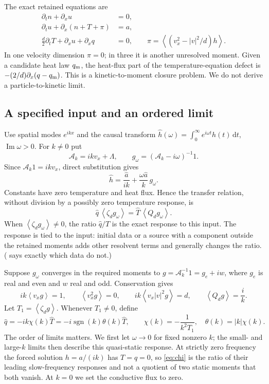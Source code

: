 \documentclass[11pt]{article}
\newcommand{\dd}{\,\mathrm d}
\newcommand{\av}[1]{\left\langle #1\right\rangle}
\newcommand{\A}{\mathcal A}
\newcommand{\sgn}{\operatorname{sgn}}
\newcommand{\Imag}{\operatorname{Im}}
\theoremstyle{definition}
\theoremstyle{remark}
\numberwithin{equation}{section}
\begin{document}
The exact retained equations are
\begin{align}
 \partial_tn+\partial_xu&=0,\nonumber\\
 \partial_tu+\partial_x(n+T+\pi)&=a,\nonumber\\
 \frac d2\partial_tT+\partial_xu+\partial_xq&=0,
 \qquad
 \pi=\av{(v_x^2-|v|^2/d)h}.
 \label{eq:hierarchy}
\end{align}
In one velocity dimension $\pi=0$; in three it is another unresolved
moment. Given a candidate heat law $q_{\rm m}$, the heat-flux part of the
temperature-equation defect is
$-(2/d)\partial_x(q-q_{\rm m})$. This is a kinetic-to-moment closure
problem. We do not derive a particle-to-kinetic limit.

\subsection{A specified input and an ordered limit}

Use spatial modes $e^{ikx}$ and the causal transform
$\widehat h(\omega)=\int_0^\infty e^{i\omega t}h(t)\dd t$,
$\Imag\omega>0$. For $k\ne0$ put
\[
 \A_k=ikv_x+\Lambda,\qquad
 g_\omega=(\A_k-i\omega)^{-1}1.
\]
Since $\A_k1=ikv_x$, direct substitution gives
\begin{equation}
 \widehat h=\frac{\widehat a}{ik}
       +\frac{\omega\widehat a}{k}\,g_\omega.
 \label{eq:resolvent}
\end{equation}
Constants have zero temperature and heat flux. Hence the transfer relation,
without division by a possibly zero temperature response, is
\begin{equation}
 \widehat q\,\av{\zeta_dg_\omega}
   =\widehat T\,\av{Q_dg_\omega}.
 \label{eq:transfer}
\end{equation}
When $\av{\zeta_dg_\omega}\ne0$, the ratio $\widehat q/\widehat T$ is the
exact response to this input. The response is tied to the input: initial
data or a source with a component outside the retained moments adds
other resolvent terms and generally changes the ratio.
( says exactly which data do not.)

Suppose $g_\omega$ converges in the required moments to
$g=\A_k^{-1}1=g_e+iw$, where $g_e$ is real and even and $w$ real and odd.
Conservation gives
\begin{equation}
 ik\av{v_xg}=1,\qquad \av{v_x^2g}=0,\qquad
 ik\av{v_x|v|^2g}=d,\qquad \av{Q_dg}=\frac{i}{k}.
 \label{eq:stationarymom}
\end{equation}
Let $T_1=\av{\zeta_dg}$. Whenever $T_1\ne0$, define
\begin{equation}
 \widehat q=-ik\chi(k)\widehat T
           =-i\sgn(k)\theta(k)\widehat T,\qquad
 \chi(k)=-\frac{1}{k^2T_1},\quad
 \theta(k)=|k|\chi(k).
 \label{eq:chi}
\end{equation}
The order of limits matters. We first let $\omega\to0$ for fixed nonzero
$k$; the small- and large-$k$ limits then describe this quasi-static
response. At strictly zero frequency the forced solution
$h=a/(ik)$ has $T=q=0$, so \eqref{eq:chi} is the ratio of their leading
slow-frequency responses and not a quotient of two static moments that
both vanish. At $k=0$ we set the conductive flux to zero.
\end{document}
